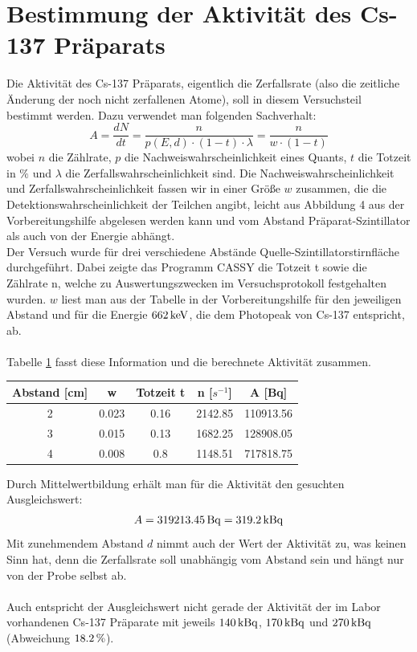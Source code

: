 \documentclass[a4paper,titlepage]{scrartcl}
\numberwithin{equation}{section}
\begin{document}
\section{Bestimmung der Aktivität des Cs-137 Präparats}
Die Aktivität des Cs-137 Präparats, eigentlich die Zerfallsrate (also die zeitliche Änderung der noch nicht zerfallenen Atome), soll in diesem Versuchsteil bestimmt werden. Dazu verwendet man folgenden Sachverhalt:
\begin{equation*}
A=\frac{dN}{dt}=\frac{n}{p(E,d) \cdot (1-t) \cdot \lambda}=\frac{n}{w \cdot (1-t)}
\end{equation*}
wobei $n$ die Zählrate, $p$ die Nachweiswahrscheinlichkeit eines Quants, $t$ die Totzeit in $\%$ und $\lambda$ die Zerfallswahrscheinlichkeit sind. Die Nachweiswahrscheinlichkeit und Zerfallswahrscheinlichkeit fassen wir in einer Größe $w$ zusammen, die die Detektionswahrscheinlichkeit der Teilchen angibt, leicht aus Abbildung 4 aus der Vorbereitungshilfe abgelesen werden kann und  vom Abstand Präparat-Szintillator als auch von der Energie abhängt.\\
Der Versuch wurde für drei verschiedene Abstände Quelle-Szintillatorstirnfläche durchgeführt. Dabei zeigte das Programm CASSY die Totzeit t sowie die Zählrate n, welche zu Auswertungszwecken im Versuchsprotokoll festgehalten wurden. $w$ liest man aus der Tabelle in der Vorbereitungshilfe für den jeweiligen Abstand und für die Energie $\unit[662]{keV}$, die dem Photopeak von Cs-137 entspricht, ab.\\ \\
Tabelle \ref{tab:aufgabe2} fasst diese Information und die berechnete Aktivität zusammen.
\begin{table}[H]
\begin{tabular}{c|c|c|c||c}
	Abstand [cm] & w & Totzeit t & n [$s^{-1}$] & A [Bq]\\
	\hline
	2 & 0.023 & 0.16 & 2142.85 & 110913.56\\
	3 & 0.015 & 0.13 & 1682.25 & 128908.05\\
	4 & 0.008 & 0.8 & 1148.51 & 717818.75\\
\end{tabular}
\label{tab:aufgabe2}
\end{table}
Durch Mittelwertbildung erhält man für die Aktivität den gesuchten Ausgleichswert:
\begin{equation*}
A=\unit[319213.45]{Bq}=\unit[319.2]{kBq}
\end{equation*}
Mit zunehmendem Abstand $d$ nimmt auch der Wert der Aktivität zu, was keinen Sinn hat, denn die Zerfallsrate soll unabhängig vom Abstand sein und hängt nur von der Probe selbst ab.\\ \\
Auch entspricht der Ausgleichswert nicht gerade der Aktivität der im Labor vorhandenen Cs-137 Präparate mit jeweils $\unit[140]{kBq}$, $\unit[170]{kBq}$ und $\unit[270]{kBq}$ (Abweichung $\unit[18.2]{\%}$).
\end{document}
